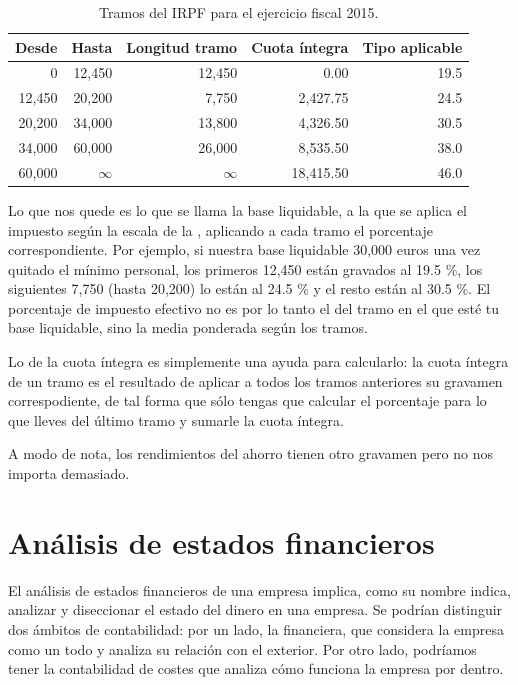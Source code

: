 \documentclass[nochap,palatino,notitlepage]{apuntes}
\begin{document}
\begin{table}[hbtp]
\centering
\footnotesize
\begin{tabular}{r|r|r|r|r}
\textbf{Desde} & \textbf{Hasta} & \textbf{Longitud tramo} & \textbf{Cuota íntegra} & \textbf{Tipo aplicable} \\ \toprule
0 & 12,450 & 12,450 & 0.00 & 19.5 \\
12,450 & 20,200 & 7,750 & 2,427.75 & 24.5 \\
20,200 & 34,000 & 13,800 & 4,326.50 & 30.5 \\
34,000 & 60,000 & 26,000 & 8,535.50 & 38.0 \\
60,000 & $\infty$ & $\infty$ & 18,415.50 & 46.0 \\
\end{tabular}
\caption{Tramos del IRPF para el ejercicio fiscal 2015.}
\label{tab:Tramos2015IRPF}
\end{table}

Lo que nos quede es lo que se llama la base liquidable, a la que se aplica el impuesto según la escala de la , aplicando a cada tramo el porcentaje correspondiente. Por ejemplo, si nuestra base liquidable 30,000 euros una vez quitado el mínimo personal, los primeros 12,450 están gravados al 19.5 \%, los siguientes 7,750 (hasta 20,200) lo están al 24.5 \% y el resto están al 30.5 \%. El porcentaje de impuesto efectivo no es por lo tanto el del tramo en el que esté tu base liquidable, sino la media ponderada según los tramos.

Lo de la cuota íntegra es simplemente una ayuda para calcularlo: la cuota íntegra de un tramo es el resultado de aplicar a todos los tramos anteriores su gravamen correspodiente, de tal forma que sólo tengas que calcular el porcentaje para lo que lleves del último tramo y sumarle la cuota íntegra.

A modo de nota, los rendimientos del ahorro tienen otro gravamen pero no nos importa demasiado.

\section{Análisis de estados financieros}

El análisis de estados financieros de una empresa implica, como su nombre indica, analizar y diseccionar el estado del dinero en una empresa. Se podrían distinguir dos ámbitos de contabilidad: por un lado, la financiera, que considera la empresa como un todo y analiza su relación con el exterior. Por otro lado, podríamos tener la contabilidad de costes que analiza cómo funciona la empresa por dentro.
\end{document}
